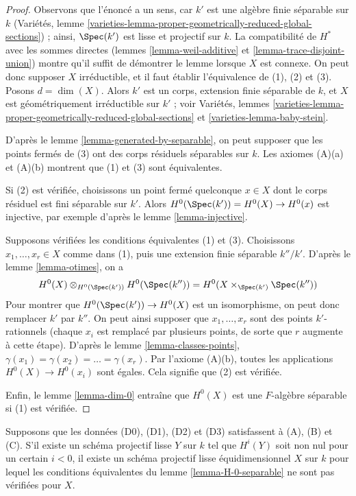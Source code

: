 \begin{proof}
Observons que l'énoncé a un sens, car $k'$ est une algèbre finie séparable
sur $k$ (Variétés, lemme
\ref{varieties-lemma-proper-geometrically-reduced-global-sections}) ;
ainsi, $\Spec(k')$ est lisse et projectif sur $k$.
La compatibilité de $H^*$ avec les sommes directes
(lemmes \ref{lemma-weil-additive} et \ref{lemma-trace-disjoint-union})
montre qu'il suffit de démontrer le lemme lorsque $X$ est connexe.
On peut donc supposer $X$ irréductible, et il faut établir
l'équivalence de (1), (2) et (3). Posons $d = \dim(X)$.
Alors $k'$ est un corps, extension finie séparable
de $k$, et $X$ est géométriquement irréductible sur $k'$ ; voir
Variétés, lemmes
\ref{varieties-lemma-proper-geometrically-reduced-global-sections} et
\ref{varieties-lemma-baby-stein}.

\medskip\noindent
D'après le lemme \ref{lemma-generated-by-separable}, on peut supposer que les points
fermés de (3) ont des corps résiduels séparables sur $k$.
Les axiomes (A)(a) et (A)(b) montrent que (1) et (3) sont équivalentes.

\medskip\noindent
Si (2) est vérifiée, choisissons un point fermé quelconque $x \in X$ dont le corps résiduel
est fini séparable sur $k'$. Alors
$H^0(\Spec(k')) = H^0(X) \to H^0(x)$ est injective, par exemple d'après
le lemme \ref{lemma-injective}.

\medskip\noindent
Supposons vérifiées les conditions équivalentes (1) et (3). Choisissons
$x_1, \ldots, x_r \in X$ comme dans (1), puis une extension finie séparable
$k''/k'$. D'après le lemme \ref{lemma-otimes}, on a
$$
H^0(X) \otimes_{H^0(\Spec(k'))} H^0(\Spec(k'')) =
H^0(X \times_{\Spec(k')} \Spec(k''))
$$
Pour montrer que
$H^0(\Spec(k')) \to H^0(X)$ est un isomorphisme,
on peut donc remplacer $k'$ par $k''$. On peut ainsi supposer que $x_1, \ldots, x_r$
sont des points $k'$-rationnels (chaque $x_i$ est remplacé par plusieurs
points, de sorte que $r$ augmente à cette étape). D'après le lemme \ref{lemma-classes-points},
$\gamma(x_1) = \gamma(x_2) = \ldots = \gamma(x_r)$.
Par l'axiome (A)(b), toutes les applications $H^0(X) \to H^0(x_i)$
sont égales. Cela signifie que (2) est vérifiée.

\medskip\noindent
Enfin, le lemme \ref{lemma-dim-0} entraîne
que $H^0(X)$ est une $F$-algèbre séparable si (1) est vérifiée.
\end{proof}

\begin{lemma}
\label{lemma-negative-cohomology}
Supposons que les données (D0), (D1), (D2) et (D3) satisfassent à (A), (B) et (C).
S'il existe un schéma projectif lisse $Y$ sur $k$ tel que
$H^i(Y)$ soit non nul pour un certain $i < 0$, il existe un schéma projectif lisse
équidimensionnel $X$ sur $k$ pour lequel les conditions équivalentes
du lemme \ref{lemma-H-0-separable} ne sont pas vérifiées pour $X$.
\end{lemma}

